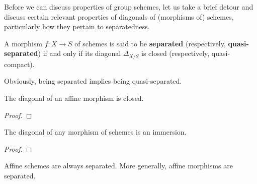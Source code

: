                 Before we can discuss properties of group schemes, let us take a brief detour and discuss certain relevant properties of diagonals of (morphisms of) schemes, particularly how they pertain to separatedness.
                \begin{definition} \label{def: (quasi)_separatedness}
                    A morphism $f: X \to S$ of schemes is said to be \textbf{separated} (respectively, \textbf{quasi-separated}) if and only if its diagonal $\Delta_{X/S}$ is closed (respectively, quasi-compact). 
                \end{definition}
                \begin{remark}
                    Obviously, being separated implies being quasi-separated.
                \end{remark}
                \begin{lemma} \label{lemma: diagonals_of_affines_are_closed}
                    The diagonal of an affine morphism is closed.
                \end{lemma}
                    \begin{proof}
                        
                    \end{proof}
                \begin{proposition} \label{prop: diagonals_of_schemes_are_immersions}
                    The diagonal of any morphism of schemes is an immersion.
                \end{proposition}
                    \begin{proof}
                        
                    \end{proof}
                \begin{corollary} \label{coro: affines_are_separated}
                    Affine schemes are always separated. More generally, affine morphisms are separated. 
                \end{corollary}
